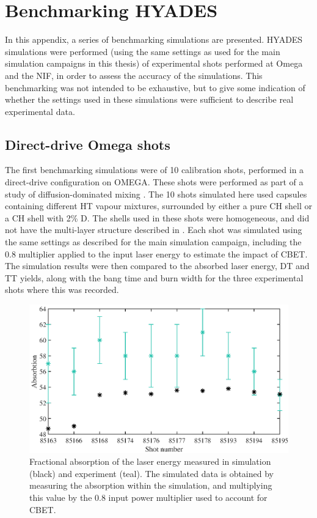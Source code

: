 \chapter{Benchmarking HYADES} \label{app:benchmark}

\minitoc

In this appendix, a series of benchmarking simulations are presented. HYADES simulations were performed (using the same settings as used for the main simulation campaigns in this thesis) of experimental shots performed at Omega and the NIF, in order to assess the accuracy of the simulations. This benchmarking was not intended to be exhaustive, but to give some indication of whether the settings used in these simulations were sufficient to describe real experimental data.

\section{Direct-drive Omega shots}

The first benchmarking simulations were of 10 calibration shots, performed in a direct-drive configuration on OMEGA. These shots were performed as part of a study of diffusion-dominated mixing \cite{Zylstra2018a}. The 10 shots simulated here used capsules containing different HT vapour mixtures, surrounded by either a pure CH shell or a CH shell with 2\% D. The shells used in these shots were homogeneous, and did not have the multi-layer structure described in \cite{Zylstra2018a}. Each shot was simulated using the same settings as described for the main simulation campaign, including the 0.8 multiplier applied to the input laser energy to estimate the impact of CBET. The simulation results were then compared to the absorbed laser energy, DT and TT yields, along with the bang time and burn width for the three experimental shots where this was recorded.

\begin{figure}[ht]
\centering
\includegraphics{figures/LowCR/BenchmarkOmegaAbsorbtion.eps}
\caption{Fractional absorption of the laser energy measured in simulation (black) and experiment (teal). The simulated data is obtained by measuring the absorption within the simulation, and multiplying this value by the 0.8 input power multiplier used to account for CBET.}
\label{fig:OmegaAbs}
\end{figure}

